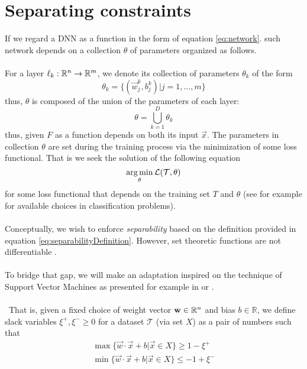 
\section{Separating constraints}\label{sec:constraint}
If we regard a DNN as a function in the form of equation \ref{eq:network}. such network depends on a collection $\theta$ of parameters organized as follows. 
\\\\
For a layer $\ell_k:\mathbb{R}^{n}\rightarrow\mathbb{R}^{m}$, we denote its collection of parameters $\theta_k$ of the form
\begin{equation}
    \theta_k = \{(\vec{w}^k_j,b^k_j)|j=1,\ldots,m\}
\end{equation}
thus, $\theta$ is composed of the union of the parameters of each layer:
\begin{equation}
    \theta = \displaystyle\bigcup_{k=1}^D\theta_k
\end{equation}
thus, given $F$ as a function depends on both its input $\vec{x}$. The parameters in collection $\theta$ are set during the training process via the minimization of some loss functional. That is we seek the solution of the following equation
\begin{equation}\label{eq:generalOptimizationProblem}
\operatorname*{arg\,min}_{\theta} \mathcal{L}(\mathcal{T},\theta)
\end{equation}
for some loss functional that depends on the training set $T$ and $\theta$ (see for example \cite{LeCun06atutorial} for available choices in classification problems). 
\\\\
Conceptually, we wish to enforce \ReLU \emph{separability} based on the definition provided in equation \ref{eq:separabilityDefinition}. However, set theoretic functions are not differentiable \cite{Glorot10Initialization,lecun2015DeepLearningBig,munkres2000Topology}. 
\\\\
To bridge that gap, we will make an adaptation inspired on the technique of Support Vector Machines as presented for example in  \cite{Burges1998TutorialOnSVMForPatternRecognition} or \cite{Hearst1998SupportVectorMachines}. 
\\\\\
That is, given a fixed choice of weight vector  $\mathbf{w}\in\mathbb{R}^{n}$ and bias $b\in\mathbb{R}$, we define slack variables $\xi^{+},\xi^{-}\geq 0$ for a dataset $\mathcal{T}$ (via set $X$) as a pair of numbers such that
\begin{equation}\label{eq:basicConstraintFormulation}
\begin{array}{lcl}
    \max\{\vec{w}\cdot\vec{x}+b|\vec{x}\in X\}\geq 1-\xi^{+}\\
    \min\{\vec{w}\cdot\vec{x}+b|\vec{x}\in X\}\leq -1+\xi^{-}\\
\end{array}
\end{equation}
